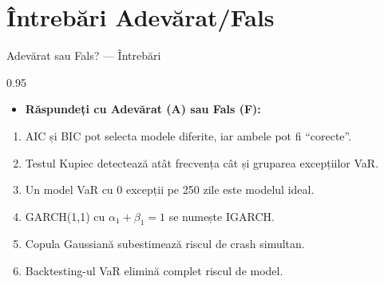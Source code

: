 \documentclass[9pt, aspectratio=169, t]{beamer}
\begin{document}
\section{Întrebări Adevărat/Fals}

\begin{frame}{Adevărat sau Fals? --- Întrebări}
    \begin{cminipage}{0.95\textwidth}
    \begin{itemize}\setlength{\itemsep}{0pt}
        \item \textbf{Răspundeți cu Adevărat (A) sau Fals (F):}
    \end{itemize}
    \vspace{0.3cm}
    \begin{enumerate}\setlength{\itemsep}{0pt}
        \item AIC și BIC pot selecta modele diferite, iar ambele pot fi ``corecte''.
        \item Testul Kupiec detectează atât frecvența cât și gruparea excepțiilor VaR.
        \item Un model VaR cu 0 excepții pe 250 zile este modelul ideal.
        \item GARCH(1,1) cu $\alpha_1 + \beta_1 = 1$ se numește IGARCH.
        \item Copula Gaussiană subestimează riscul de crash simultan.
        \item Backtesting-ul VaR elimină complet riscul de model.
    \end{enumerate}
    \end{cminipage}
\end{frame}
\end{document}
